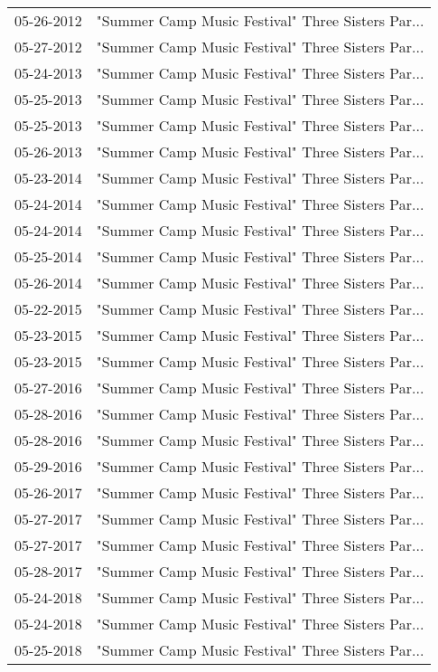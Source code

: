 \begin{supertabular}{ll}
 05-26-2012 &  "Summer Camp Music Festival" Three Sisters Par... \\
 05-27-2012 &  "Summer Camp Music Festival" Three Sisters Par... \\
 05-24-2013 &  "Summer Camp Music Festival" Three Sisters Par... \\
 05-25-2013 &  "Summer Camp Music Festival" Three Sisters Par... \\
 05-25-2013 &  "Summer Camp Music Festival" Three Sisters Par... \\
 05-26-2013 &  "Summer Camp Music Festival" Three Sisters Par... \\
 05-23-2014 &  "Summer Camp Music Festival" Three Sisters Par... \\
 05-24-2014 &  "Summer Camp Music Festival" Three Sisters Par... \\
 05-24-2014 &  "Summer Camp Music Festival" Three Sisters Par... \\
 05-25-2014 &  "Summer Camp Music Festival" Three Sisters Par... \\
 05-26-2014 &  "Summer Camp Music Festival" Three Sisters Par... \\
 05-22-2015 &  "Summer Camp Music Festival" Three Sisters Par... \\
 05-23-2015 &  "Summer Camp Music Festival" Three Sisters Par... \\
 05-23-2015 &  "Summer Camp Music Festival" Three Sisters Par... \\
 05-27-2016 &  "Summer Camp Music Festival" Three Sisters Par... \\
 05-28-2016 &  "Summer Camp Music Festival" Three Sisters Par... \\
 05-28-2016 &  "Summer Camp Music Festival" Three Sisters Par... \\
 05-29-2016 &  "Summer Camp Music Festival" Three Sisters Par... \\
 05-26-2017 &  "Summer Camp Music Festival" Three Sisters Par... \\
 05-27-2017 &  "Summer Camp Music Festival" Three Sisters Par... \\
 05-27-2017 &  "Summer Camp Music Festival" Three Sisters Par... \\
 05-28-2017 &  "Summer Camp Music Festival" Three Sisters Par... \\
 05-24-2018 &  "Summer Camp Music Festival" Three Sisters Par... \\
 05-24-2018 &  "Summer Camp Music Festival" Three Sisters Par... \\
 05-25-2018 &  "Summer Camp Music Festival" Three Sisters Par... \\

\end{supertabular}
